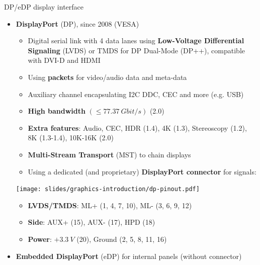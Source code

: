 \begin{frame}{DP/eDP display interface}
  \begin{itemize}
  \item \textbf{DisplayPort} (DP), since 2008 (VESA)
    \begin{itemize}
    \item Digital serial link with 4 data lanes using \textbf{Low-Voltage Differential Signaling} (LVDS)
    or TMDS for DP Dual-Mode (DP++), compatible with DVI-D and HDMI
    \item Using \textbf{packets} for video/audio data and meta-data 
    \item Auxiliary channel encapsulating I2C DDC, CEC and more (e.g. USB)
    \item \textbf{High bandwidth} \((\leq 77.37~Gbit/s)\) (2.0)
    \item \textbf{Extra features}: Audio, CEC, HDR (1.4), 4K (1.3), Stereoscopy (1.2),\\8K (1.3-1.4),  10K-16K (2.0)
    \item \textbf{Multi-Stream Transport} (MST) to chain displays
    \item Using a dedicated (and proprietary) \textbf{DisplayPort connector} for signals:
    \end{itemize}
  \begin{center}
    \texttt{[image: slides/graphics-introduction/dp-pinout.pdf]}
  \end{center}
  \begin{itemize}
  \item \textbf{LVDS/TMDS}: ML+ {\footnotesize(1, 4, 7, 10)}, ML- {\footnotesize(3, 6, 9, 12)}
  \item \textbf{Side}: AUX+ (15), AUX- (17), HPD (18)
  \item \textbf{Power}: \(+3.3~V\) {\footnotesize(20)}, Ground {\footnotesize(2, 5, 8, 11, 16)}
  \end{itemize}
  \item \textbf{Embedded DisplayPort} (eDP) for internal panels (without connector)
  \end{itemize}
\end{frame}


